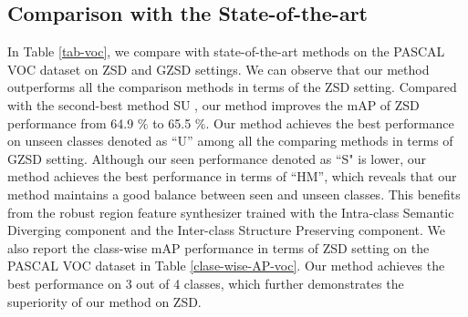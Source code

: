 \documentclass[10pt,twocolumn,letterpaper]{article}
\begin{document}
\subsection{Comparison with the State-of-the-art}
In Table \ref{tab-voc}, we compare with state-of-the-art methods on the PASCAL VOC dataset on ZSD and GZSD settings. We can observe that our method outperforms all the comparison methods in terms of the ZSD setting. Compared with the second-best method SU \cite{hayat2020synthesizing}, our method improves the mAP of ZSD performance from 64.9 $\%$ to 65.5 $\%$. Our method achieves the best performance on unseen classes denoted as ``U'' among all the comparing methods in terms of GZSD setting.
Although our seen performance denoted as ``S" is lower, our method achieves the best performance in terms of ``HM'', which reveals that our method maintains a good balance between seen and unseen classes. This benefits from the robust region feature synthesizer trained with the Intra-class Semantic Diverging component and the Inter-class Structure Preserving component.
We also report the class-wise mAP performance in terms of ZSD setting on the PASCAL VOC dataset in Table \ref{clase-wise-AP-voc}. Our method
achieves the best performance on 3 out of 4 classes, which further demonstrates the superiority of our method on ZSD.
\end{document}
